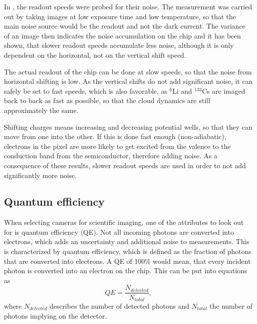 In , the readout speeds were probed for their noise. The measurement was carried out by taking images at low exposure time and low temperature, so that the main noise source would be the readout and not the dark current. The variance of an image then indicates the noise accumulation on the chip and it has been shown, that slower readout speeds accumulate less noise, although it is only dependent on the horizontal, not on the vertical shift speed.

The actual readout of the chip can be done at slow speeds, so that the noise from horizontal shifting is low. As the vertical shifts do not add significant noise, it can safely be set to fast speeds, which is also favorable, as $^6$Li and $^{133}$Cs are imaged back to back as fast as possible, so that the cloud dynamics are still approximately the same.

Shifting charges means increasing and decreasing potential wells, so that they can move from one into the other. If this is done fast enough (non-adiabatic), electrons in the pixel are more likely to get excited from the valence to the conduction band from the semiconductor, therefore adding noise. As a consequence of these results, slower readout speeds are used in order to not add significantly more noise.


\newpage
\subsection{Quantum efficiency}
\label{ch:quantumeff}
When selecting cameras for scientific imaging, one of the attributes to look out for is quantum efficiency (QE). Not all incoming photons are converted into electrons, which adds an uncertainty and additional noise to measurements. This is characterized by quantum efficiency, which is defined as the fraction of photons that are converted into electrons. A  QE of 100\% would mean, that every incident photon is converted into an electron on the chip. This can be put into equations as
\begin{equation}
QE = \frac{N_{detected}}{N_{total}},
\end{equation}
where $N_{detected}$ describes the number of detected photons and $N_{total}$ the number of photons implying on the detector.

